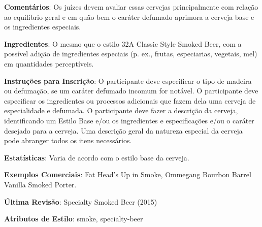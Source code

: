 \textbf{Comentários}: Os juízes devem avaliar essas cervejas principalmente com relação ao equilíbrio geral e em quão bem o caráter defumado aprimora a cerveja base e os ingredientes especiais.

\textbf{Ingredientes}: O mesmo que o estilo 32A Classic Style Smoked Beer, com a possível adição de ingredientes especiais (p. ex., frutas, especiarias, vegetais, mel) em quantidades perceptíveis.

\textbf{Instruções para Inscrição}: O participante deve especificar o tipo de madeira ou defumação, se um caráter defumado incomum for notável. O participante deve especificar os ingredientes ou processos adicionais que fazem dela uma cerveja de especialidade e defumada. O participante deve fazer a descrição da cerveja, identificando um Estilo Base e/ou os ingredientes e especificações e/ou o caráter desejado para a cerveja. Uma descrição geral da natureza especial da cerveja pode abranger todos os itens necessários.

\textbf{Estatísticas}: Varia de acordo com o estilo base da cerveja.

\textbf{Exemplos Comerciais}: Fat Head’s Up in Smoke, Ommegang Bourbon Barrel Vanilla Smoked Porter.

\textbf{Última Revisão}: Specialty Smoked Beer (2015)

\textbf{Atributos de Estilo}: smoke, specialty-beer

